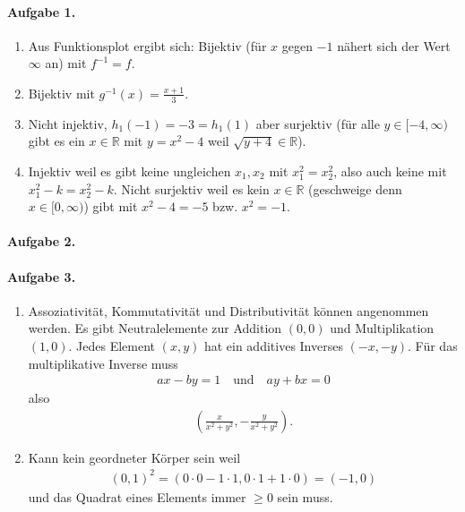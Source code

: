 \documentclass{article}
\begin{document}
\paragraph{Aufgabe 1.}
\begin{enumerate}
    \item Aus Funktionsplot ergibt sich: Bijektiv (für $x$ gegen $-1$ nähert sich der Wert $\infty$ an) mit $f^{-1} = f$.
    \item Bijektiv mit $g^{-1}(x) = \frac{x + 1}{3}$.
    \item Nicht injektiv, $h_1(-1) = -3 = h_1(1)$ aber surjektiv (für alle $y \in [-4,\infty)$ gibt es ein $x \in \mathbb{R}$ mit $y = x^2 - 4$ weil $\sqrt{y + 4} \in \mathbb{R}$).
    \item Injektiv weil es gibt keine ungleichen $x_1, x_2$ mit $x_1^2 = x_2^2$, also auch keine mit $x_1^2 - k = x_2^2 -k$. Nicht surjektiv weil es kein $x \in \mathbb{R}$ (geschweige denn $x \in [0, \infty)$) gibt mit $x^2 - 4 = -5$ bzw. $x^2 = -1$. 
\end{enumerate}

\paragraph{Aufgabe 2.}

\paragraph{Aufgabe 3.}

\begin{enumerate}
    \item Assoziativität, Kommutativität und Distributivität können angenommen werden. Es gibt Neutralelemente zur Addition $(0, 0)$ und Multiplikation $(1, 0)$. Jedes Element $(x, y)$ hat ein additives Inverses $(-x, -y)$. Für das multiplikative Inverse muss
    \begin{align*}
        ax - by = 1 \quad\text{und}\quad ay + bx = 0
    \end{align*}
    also
    \begin{align*}
        \left(\frac{x}{x^2 + y^2}, -\frac{y}{x^2 + y^2}\right).
    \end{align*}

    \item Kann kein geordneter Körper sein weil
    \begin{align*}
        (0, 1)^2 = (0 \cdot 0 - 1 \cdot 1, 0 \cdot 1 + 1 \cdot 0) = (-1, 0)
    \end{align*}
    und das Quadrat eines Elements immer $\geq 0$ sein muss.
\end{enumerate}
\end{document}
